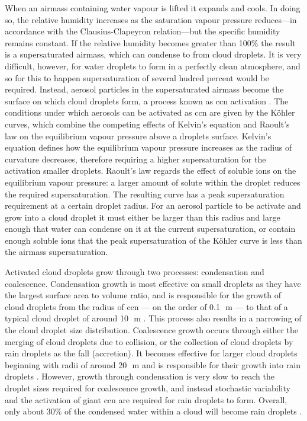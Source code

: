 When an airmass containing water vapour is lifted it expands and cools.
In doing so, the relative humidity increases as the saturation vapour pressure reduces---in accordance with the Clausius-Clapeyron relation---but the specific humidity remains constant. 
If the relative humidity becomes greater than 100\% the result is a supersaturated airmass, which can condense to from cloud droplets.
It is very difficult, however, for water droplets to form in a perfectly clean atmosphere, and so for this to happen supersaturation of several hudred percent would be required.
Instead, aerosol particles in the supersaturated airmass become the surface on which cloud droplets form, a process known as \acrshort{ccn} activation \citep{acci}.
The conditions under which aerosols can be activated as \acrshort{ccn} are given by the K{\"o}hler curves, which combine the competing effects of Kelvin's equation and Raoult's law on the equilibrium vapour pressure above a droplets surface. 
Kelvin's equation defines how the equilibrium vapour pressure increases as the radius of curvature decreases, therefore requiring a higher supersaturation for the activation smaller droplets. 
Raoult's law regards the effect of soluble ions on the equilibrium vapour pressure: a larger amount of solute within the droplet reduces the required supersaturation. The resulting curve has a peak supersaturation requirement at a certain droplet radius. 
For an aerosol particle to be activate and grow into a cloud droplet it must either be larger than this radius and large enough that water can condense on it at the current supersaturation, or contain enough soluble ions that the peak supersaturation of the K{\"o}hler curve is less than the airmass supersaturation.

Activated cloud droplets grow through two processes: condensation and coalescence. 
Condensation growth is most effective on small droplets as they have the largest surface area to volume ratio, and is responsible for the growth of cloud droplets from the radius of \acrshort{ccn} --- on the order of 0.1\,\unit{\mu m} --- to that of a typical cloud droplet of around 10\,\unit{\mu m} \citep{cloud_physics}. 
This process also results in a narrowing of the cloud droplet size distribution. 
Coalescence growth occurs through either the merging of cloud droplets due to collision, or the collection of cloud droplets by rain droplets as the fall (accretion).
It becomes effective for larger cloud droplets beginning with radii of around 20\,\unit{\mu m} and is responsible for their growth into rain droplets \citep{cloud_physics}.
However, growth through condensation is very slow to reach the droplet sizes required for coalescence growth, and instead stochastic variability and the activation of giant \acrshort{ccn} \citep{feingold_impact_1999} are required for rain droplets to form. 
Overall, only about 30\% of the condensed water within a cloud will become rain droplets \citep{trenberth_changing_2003}.



